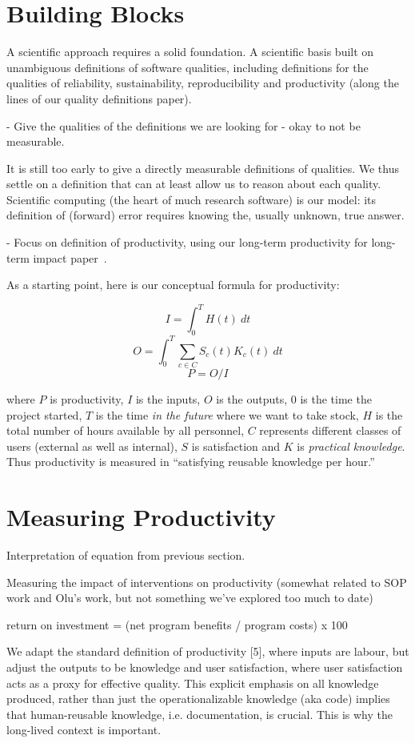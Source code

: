 \documentclass[sigconf, authorversion, nonacm]{acmart}
\begin{document}
\section{Building Blocks}

A scientific approach requires a solid foundation.  A scientific basis built on
unambiguous definitions of software qualities, including definitions for the
qualities of reliability, sustainability, reproducibility and productivity
(along the lines of our quality definitions paper).  

- Give the qualities of the definitions we are looking for - okay to not be
measurable.  

It is still too early to give a directly measurable definitions of qualities. We
thus settle on a definition that can at least allow us to reason about each
quality.  Scientific computing (the heart of much research software) is our
model: its definition of (forward) error requires knowing the, usually unknown,
true answer.

- Focus on definition of productivity, using our long-term productivity for
long-term impact paper~\cite{SmithAndCarette2020arXiv}. 

As a starting point, here is our conceptual formula for productivity:

$$ I = \int_{0}^{T} H(t)\ dt $$
$$ O = \int_{0}^{T} \sum_{c \in C} S_c(t) K_c(t)\ dt $$
$$P = O / I$$ 

\noindent where $P$ is productivity, $I$ is the inputs, $O$ is the outputs, $0$
is the time the project started, $T$ is the time \emph{in the future} where we
want to take stock, $H$ is the total number of hours available by all personnel,
$C$ represents different classes of users (external as well as internal), $S$ is
satisfaction and $K$ is \emph{practical knowledge}.  Thus productivity is
measured in ``satisfying reusable knowledge per hour.''

\section{Measuring Productivity}

Interpretation of equation from previous section.

Measuring the impact of interventions on productivity (somewhat related to SOP
work and Olu’s work, but not something we’ve explored too much to date)

return on investment = (net program benefits / program costs) x 100

We adapt the standard definition of productivity [5], where inputs are labour,
but adjust the outputs to be knowledge and user satisfaction, where user
satisfaction acts as a proxy for effective quality. This explicit emphasis on
all knowledge produced, rather than just the operationalizable knowledge (aka
code) implies that human-reusable knowledge, i.e. documentation, is crucial.
This is why the long-lived context is important.
\end{document}

